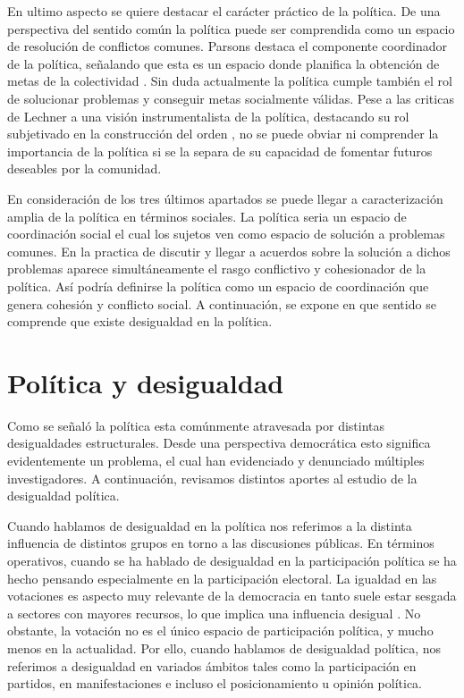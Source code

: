 \documentclass[12pt,twoside]{templates/facsothesis}
\begin{document}
En ultimo aspecto se quiere destacar el carácter práctico de la política. De una perspectiva del sentido común la política puede ser comprendida como un espacio de resolución de conflictos comunes. Parsons destaca el componente coordinador de la política, señalando que esta es un espacio donde planifica la obtención de metas de la colectividad \citet{chernilo_Sociedad_1999}. Sin duda actualmente la política cumple también el rol de solucionar problemas y conseguir metas socialmente válidas. Pese a las criticas de Lechner a una visión instrumentalista de la política, destacando su rol subjetivado en la construcción del orden \citep{jimenez_concepto_2012}, no se puede obviar ni comprender la importancia de la política si se la separa de su capacidad de fomentar futuros deseables por la comunidad.

En consideración de los tres últimos apartados se puede llegar a caracterización amplia de la política en términos sociales. La política seria un espacio de coordinación social el cual los sujetos ven como espacio de solución a problemas comunes. En la practica de discutir y llegar a acuerdos sobre la solución a dichos problemas aparece simultáneamente el rasgo conflictivo y cohesionador de la política. Así podría definirse la política como un espacio de coordinación que genera cohesión y conflicto social. A continuación, se expone en que sentido se comprende que existe desigualdad en la política.

\hypertarget{poluxedtica-y-desigualdad}{%
\section{Política y desigualdad}\label{poluxedtica-y-desigualdad}}

Como se señaló la política esta comúnmente atravesada por distintas desigualdades estructurales. Desde una perspectiva democrática esto significa evidentemente un problema, el cual han evidenciado y denunciado múltiples investigadores. A continuación, revisamos distintos aportes al estudio de la desigualdad política.

Cuando hablamos de desigualdad en la política nos referimos a la distinta influencia de distintos grupos en torno a las discusiones públicas. En términos operativos, cuando se ha hablado de desigualdad en la participación política se ha hecho pensando especialmente en la participación electoral. La igualdad en las votaciones es aspecto muy relevante de la democracia en tanto suele estar sesgada a sectores con mayores recursos, lo que implica una influencia desigual \citep{lijphart_Unequal_1997}. No obstante, la votación no es el único espacio de participación política, y mucho menos en la actualidad. Por ello, cuando hablamos de desigualdad política, nos referimos a desigualdad en variados ámbitos tales como la participación en partidos, en manifestaciones e incluso el posicionamiento u opinión política.
\end{document}
